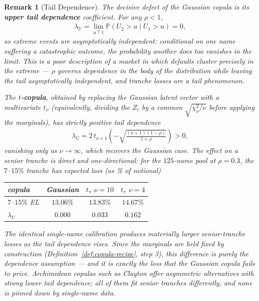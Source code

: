 \documentclass{report}
\theoremstyle{spacedplain}
\theoremstyle{spaceddefinition}
\theoremstyle{spacedremark}
\newtheorem{remark}[theorem]{Remark}
\begin{document}
\begin{remark}[Tail Dependence]
\label{rmk:tail-dep}
The decisive defect of the Gaussian copula is its \textbf{upper tail dependence} coefficient. For any $\rho < 1$,
\begin{align}
    \lambda_U = \lim_{u \uparrow 1} \mathbb{P}(U_2 > u \mid U_1 > u) = 0,
\end{align}
so extreme events are \emph{asymptotically independent}: conditional on one name suffering a catastrophic outcome, the probability another does too vanishes in the limit. This is a poor description of a market in which defaults cluster precisely in the extreme --- $\rho$ governs dependence in the \emph{body} of the distribution while leaving the tail asymptotically independent, and tranche losses are a tail phenomenon.

The \textbf{$t$-copula}, obtained by replacing the Gaussian latent vector with a multivariate $t_\nu$ (equivalently, dividing the $Z_i$ by a common $\sqrt{\chi^2_\nu/\nu}$ before applying the marginals), has \emph{strictly positive} tail dependence
\begin{align}
    \lambda_U = 2\,t_{\nu+1}\!\left(-\sqrt{\frac{(\nu+1)(1-\rho)}{1+\rho}}\right) > 0,
\end{align}
vanishing only as $\nu \to \infty$, which recovers the Gaussian case. The effect on a senior tranche is direct and one-directional: for the $125$-name pool at $\rho = 0.3$, the $7$--$15\%$ tranche has expected loss (as \% of notional)
\begin{center}
\renewcommand{\arraystretch}{1.1}
\begin{tabular}{@{}lccc@{}}
\toprule
copula & Gaussian & $t$, $\nu = 10$ & $t$, $\nu = 4$ \\
\midrule
$7$--$15\%$ EL & $13.06\%$ & $13.83\%$ & $14.67\%$ \\
$\lambda_U$    & $0.000$   & $0.033$   & $0.162$ \\
\bottomrule
\end{tabular}
\end{center}
The identical single-name calibration produces materially larger senior-tranche losses as the tail dependence rises. Since the marginals are held fixed by construction (Definition~\ref{def:copula-recipe}, step 3), this difference is \emph{purely} the dependence assumption --- and it is exactly the loss that the Gaussian copula fails to price. Archimedean copulas such as Clayton offer asymmetric alternatives with strong \emph{lower} tail dependence; all of them fit senior tranches differently, and none is pinned down by single-name data.
\end{remark}
\end{document}
